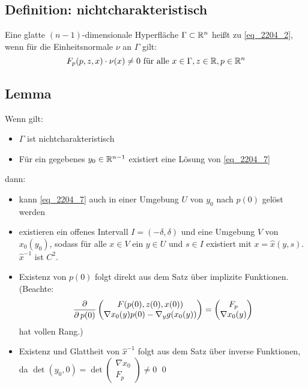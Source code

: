 \subsection{Definition: nichtcharakteristisch}
\label{def_nichtchar} \label{def_5}
	Eine glatte $(n-1)$-dimensionale Hyperfläche\marginnote{[5]} $\Gamma \subset \mathbb{R}^n$ heißt  zu \eqref{eq_2204_2}, wenn für die Einheitsnormale $\nu$ an $\Gamma$ gilt:
	\[ F_p(p,z,x) \cdot \nu(x) \neq 0 \text{ für alle } x \in \Gamma, z \in \mathbb{R}, p \in \mathbb{R}^n \]
	
\subsection{Lemma}
\label{lemma_6}
	Wenn gilt: \marginnote{[6]} \begin{itemize}
	\item $\Gamma$ ist nichtcharakteristisch
	\item Für ein gegebenes $y_0 \in \mathbb{R}^{n-1}$ existiert eine Lösung von \eqref{eq_2204_7}
	\end{itemize}
	dann: \begin{itemize}
		\item kann \eqref{eq_2204_7} auch in einer Umgebung $U$ von $y_0$ nach $p(0)$ gelöst werden
		\item existieren ein offenes Intervall $I = (-\delta,\delta)$ und eine Umgebung $V$ von $x_0(y_0)$, sodass für alle $x \in V$ ein $y \in U$ und $s \in I$ existiert mit $x = \widehat{x}(y,s)$. $\widehat{x}^{-1}$ ist $C^2$.
	\end{itemize}
	
	\begin{itemize}
		\item Existenz von $p(0)$ folgt direkt aus dem Satz über implizite Funktionen. (Beachte:
		\[ \frac{\operatorname{\partial}}{\operatorname{\partial} p(0)} \begin{pmatrix}
		F(p(0),z(0),x(0)) \\ \nabla x_0 (y) p(0) - \nabla_y g(x_0(y)) \end{pmatrix} = \begin{pmatrix}
		F_p \\ \nabla x_0 (y) \end{pmatrix} \]
		hat vollen Rang.)
		\item Existenz und Glattheit von $\widehat{x}^{-1}$ folgt aus dem Satz über inverse Funktionen, da $\det (y_0,0) = \det \begin{pmatrix}	\nabla x_0 \\ F_p \end{pmatrix} \neq 0$ \qed
	\end{itemize}
	
